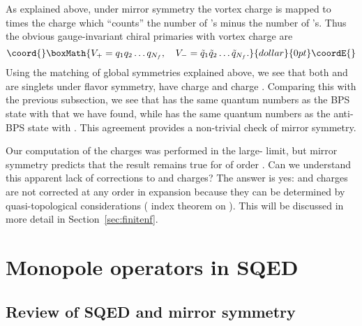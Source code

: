 \documentclass[a4paper,12pt, amsfonts, amssymb]{article}
\providecommand{\RR}{{\mathbb R}}
\renewcommand{\SS}{{\mathbb S}}
\providecommand{\tq}{{\tilde q}}
\begin{document}
As explained above, under mirror symmetry the vortex charge is mapped to 
\coordHE{} times the charge which ``counts'' the number of \coordHE{}'s minus the 
number of \myHighlight{$\tq$}\coordHE{}'s. Thus the obvious gauge-invariant chiral primaries with
vortex charge \coordHE{} are
$$\coord{}\boxMath{
V_+=q_1 q_2\ldots q_{N_f},\quad V_-=\tq_1 \tq_2\ldots \tq_{N_f}.
}{dollar}{0pt}\coordE{}$$
Using the matching of global symmetries explained above, we see that both
\coordHE{} and \coordHE{} are singlets under \coordHE{} flavor symmetry, have \coordHE{} charge \coordHE{} and \coordHE{} charge \coordHE{}. 
Comparing this with the previous subsection, we see that \coordHE{} has
the same quantum numbers as the BPS state
with \coordHE{} that we have found, while \coordHE{} has the same quantum 
numbers as the anti-BPS state with \coordHE{}.
This agreement provides a non-trivial check of \coordHE{} mirror symmetry.

Our computation of the charges was performed in the large-\coordHE{} limit,
but mirror symmetry predicts that the result remains true for \coordHE{} of
order \coordHE{}. Can we understand this apparent lack of \coordHE{} corrections
to \coordHE{} and \coordHE{} charges?
The answer is yes: \coordHE{} and \coordHE{} charges are not corrected at any
order in \coordHE{} expansion
because they can be determined by quasi-topological considerations 
(\coordHE{} index theorem on \myHighlight{$\SS^2\times\RR$}\coordHE{}).
This will be discussed in more detail in Section~\ref{sec:finitenf}.

\section{Monopole operators in \coordHE{}  \coordHE{} SQED}\label{sec:nfour}

\subsection{Review of \coordHE{} SQED and \coordHE{} mirror symmetry}
\end{document}
